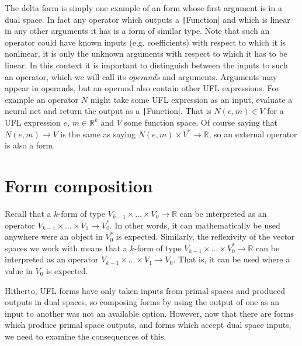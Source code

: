 \documentclass[a4paper,11pt]{article}
\begin{document}
The delta form is simply one example of an form whose first argument is in a dual space. In fact any operator which outputs a \texttt|Function| and which is linear in any other arguments it has is a form of similar type. Note that such an operator could have known inputs (e.g. coefficients) with respect to which it is nonlinear, it is only the unknown arguments with respect to which it has to be linear. In this context it is important to distinguish between the inputs to such an operator, which we will call its \emph{operands} and arguments. Arguments may appear in operands, but an operand also contain other UFL expressions. For example an operator $N$ might take some UFL expression as an input, evaluate a neural net and return the output as a \texttt|Function|. That is $N(e, m)\in V$ for a UFL expression $e$, $m\in\mathbb R^k$ and $V$ some function space. Of course saying that $N(e,m)\rightarrow V$ is the same as saying $N(e, m) \times V^* \rightarrow \mathbb{R}$, so an external operator is also a form.

\section{Form composition}

Recall that a $k$-form of type $V_{k-1}\times\ldots \times V_0 \rightarrow \mathbb{R}$ can be interpreted as an operator $V_{k-1}\times\ldots \times V_1 \rightarrow V_0^*$. In other words, it can mathematically be used anywhere were an object in $V_0^*$ is expected. Similarly, the reflexivity of the vector spaces we work with means that a $k$-form of type $V_{k-1}\times\ldots \times V_0^* \rightarrow \mathbb{R}$ can be interpreted as an operator $V_{k-1}\times\ldots \times V_1 \rightarrow V_0$. That is, it can be used where a value in $V_0$ is expected.

Hitherto, UFL forms have only taken inputs from primal spaces and produced outputs in dual spaces, so composing forms by using the output of one as an input to another was not an available option. However, now that there are forms which produce primal space outputs, and forms which accept dual space inputs, we need to examine the consequences of this.
\end{document}

